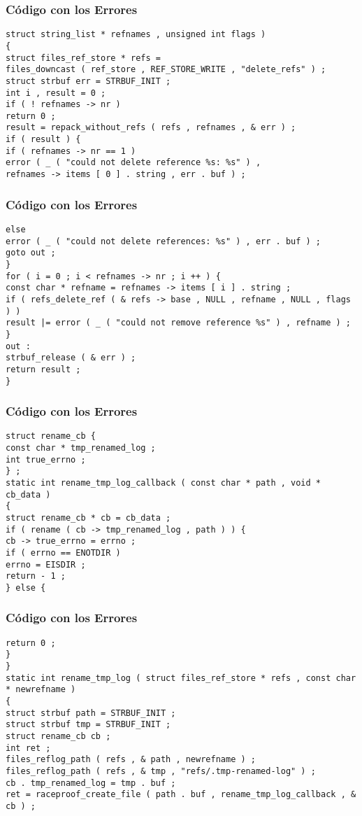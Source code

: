 \documentclass{beamer}
\begin{document}
\begin{frame}[fragile]
\frametitle{C\'odigo con los Errores}
\begin{verbatim}
struct string_list * refnames , unsigned int flags ) 
{ 
struct files_ref_store * refs = 
files_downcast ( ref_store , REF_STORE_WRITE , "delete_refs" ) ; 
struct strbuf err = STRBUF_INIT ; 
int i , result = 0 ; 
if ( ! refnames -> nr ) 
return 0 ; 
result = repack_without_refs ( refs , refnames , & err ) ; 
if ( result ) { 
if ( refnames -> nr == 1 ) 
error ( _ ( "could not delete reference %s: %s" ) , 
refnames -> items [ 0 ] . string , err . buf ) ; 
\end{verbatim}
\end{frame}
\begin{frame}[fragile]
\frametitle{C\'odigo con los Errores}
\begin{verbatim}
else 
error ( _ ( "could not delete references: %s" ) , err . buf ) ; 
goto out ; 
} 
for ( i = 0 ; i < refnames -> nr ; i ++ ) { 
const char * refname = refnames -> items [ i ] . string ; 
if ( refs_delete_ref ( & refs -> base , NULL , refname , NULL , flags ) ) 
result |= error ( _ ( "could not remove reference %s" ) , refname ) ; 
} 
out : 
strbuf_release ( & err ) ; 
return result ; 
} 
\end{verbatim}
\end{frame}
\begin{frame}[fragile]
\frametitle{C\'odigo con los Errores}
\begin{verbatim}
struct rename_cb { 
const char * tmp_renamed_log ; 
int true_errno ; 
} ; 
static int rename_tmp_log_callback ( const char * path , void * cb_data ) 
{ 
struct rename_cb * cb = cb_data ; 
if ( rename ( cb -> tmp_renamed_log , path ) ) { 
cb -> true_errno = errno ; 
if ( errno == ENOTDIR ) 
errno = EISDIR ; 
return - 1 ; 
} else { 
\end{verbatim}
\end{frame}
\begin{frame}[fragile]
\frametitle{C\'odigo con los Errores}
\begin{verbatim}
return 0 ; 
} 
} 
static int rename_tmp_log ( struct files_ref_store * refs , const char * newrefname ) 
{ 
struct strbuf path = STRBUF_INIT ; 
struct strbuf tmp = STRBUF_INIT ; 
struct rename_cb cb ; 
int ret ; 
files_reflog_path ( refs , & path , newrefname ) ; 
files_reflog_path ( refs , & tmp , "refs/.tmp-renamed-log" ) ; 
cb . tmp_renamed_log = tmp . buf ; 
ret = raceproof_create_file ( path . buf , rename_tmp_log_callback , & cb ) ; 
\end{verbatim}
\end{frame}
\end{document}

